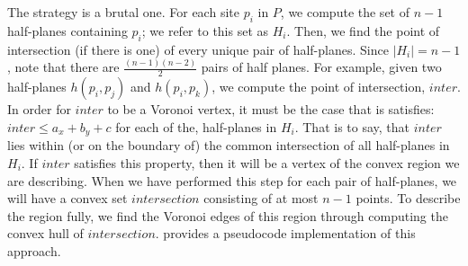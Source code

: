 \documentclass[12pt,twoside]{reedthesis}
\begin{document}
     The strategy is a brutal one. For each site $p_{i}$ in $P$, we compute the set of $n-1$ half-planes containing $p_{i}$; we refer to this set as $H_{i}$. Then, we find the point of intersection (if there is one) of every unique pair of half-planes. Since $|H_{i}| = n-1$, note that there are $\frac{(n-1)(n-2)}{2}$ pairs of half planes. For example, given two half-planes $h(p_{i}, p_{j})$ and $h(p_{i}, p_{k})$, we compute the point of intersection, $inter$. In order for $inter$ to be a Voronoi vertex, it must be the case that is satisfies: $inter \leq a_x + b_y + c$ for each of the, half-planes in $H_{i}$. That is to say, that $inter$ lies within (or on the boundary of) the common intersection of all half-planes in $H_{i}$. If $inter$ satisfies this property, then it will be a vertex of the convex region we are describing. When we have performed this step for each pair of half-planes, we will have a convex set $\textit{intersection}$ consisting of at most $n-1$ points. To describe the region fully, we find the Voronoi edges of this region through computing the convex hull of $\textit{intersection}$.  provides a pseudocode implementation of this approach. \par



\end{document}
